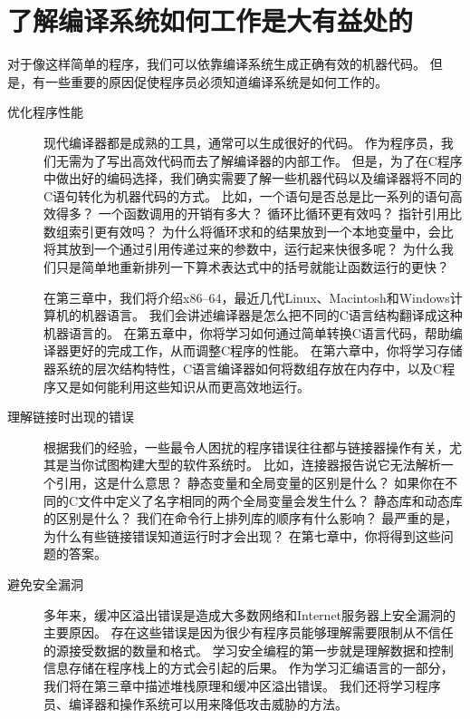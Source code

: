 \section{了解编译系统如何工作是大有益处的}
{
    对于像这样简单的程序，我们可以依靠编译系统生成正确有效的机器代码。
    但是，有一些重要的原因促使程序员必须知道编译系统是如何工作的。

    \begin{description}
        \item[优化程序性能]
        {
            现代编译器都是成熟的工具，通常可以生成很好的代码。
            作为程序员，我们无需为了写出高效代码而去了解编译器的内部工作。
            但是，为了在C程序中做出好的编码选择，我们确实需要了解一些机器代码以及编译器将不同的C语句转化为机器代码的方式。
            比如，一个语句是否总是比一系列的语句高效得多？
            一个函数调用的开销有多大？
            循环比循环更有效吗？
            指针引用比数组索引更有效吗？
            为什么将循环求和的结果放到一个本地变量中，会比将其放到一个通过引用传递过来的参数中，运行起来快很多呢？
            为什么我们只是简单地重新排列一下算术表达式中的括号就能让函数运行的更快？

            在第三章中，我们将介绍x86--64，最近几代Linux、Macintosh和Windows计算机的机器语言。
            我们会讲述编译器是怎么把不同的C语言结构翻译成这种机器语言的。
            在第五章中，你将学习如何通过简单转换C语言代码，帮助编译器更好的完成工作，从而调整C程序的性能。
            在第六章中，你将学习存储器系统的层次结构特性，C语言编译器如何将数组存放在内存中，以及C程序又是如何能利用这些知识从而更高效地运行。
        }
        \item[理解链接时出现的错误]
        {
            根据我们的经验，一些最令人困扰的程序错误往往都与链接器操作有关，尤其是当你试图构建大型的软件系统时。
            比如，连接器报告说它无法解析一个引用，这是什么意思？
            静态变量和全局变量的区别是什么？
            如果你在不同的C文件中定义了名字相同的两个全局变量会发生什么？
            静态库和动态库的区别是什么？
            我们在命令行上排列库的顺序有什么影响？
            最严重的是，为什么有些链接错误知道运行时才会出现？
            在第七章中，你将得到这些问题的答案。
        }
        \item[避免安全漏洞]
        {
            多年来，缓冲区溢出错误是造成大多数网络和Internet服务器上安全漏洞的主要原因。
            存在这些错误是因为很少有程序员能够理解需要限制从不信任的源接受数据的数量和格式。
            学习安全编程的第一步就是理解数据和控制信息存储在程序栈上的方式会引起的后果。
            作为学习汇编语言的一部分，我们将在第三章中描述堆栈原理和缓冲区溢出错误。
            我们还将学习程序员、编译器和操作系统可以用来降低攻击威胁的方法。
        }
    \end{description}
}

\endinput
